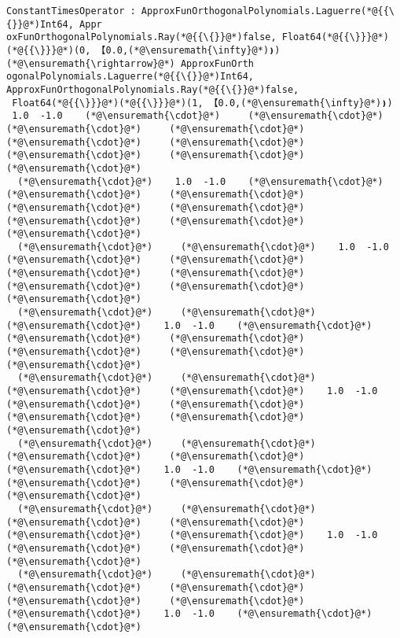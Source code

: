 \documentclass[12pt,a4paper]{article}
\begin{document}
\begin{lstlisting}
ConstantTimesOperator : ApproxFunOrthogonalPolynomials.Laguerre(*@{{\{}}@*)Int64, Appr
oxFunOrthogonalPolynomials.Ray(*@{{\{}}@*)false, Float64(*@{{\}}}@*)(*@{{\}}}@*)(0, 【0.0,(*@\ensuremath{\infty}@*)❫) (*@\ensuremath{\rightarrow}@*) ApproxFunOrth
ogonalPolynomials.Laguerre(*@{{\{}}@*)Int64, ApproxFunOrthogonalPolynomials.Ray(*@{{\{}}@*)false,
 Float64(*@{{\}}}@*)(*@{{\}}}@*)(1, 【0.0,(*@\ensuremath{\infty}@*)❫)
 1.0  -1.0    (*@\ensuremath{\cdot}@*)     (*@\ensuremath{\cdot}@*)     (*@\ensuremath{\cdot}@*)     (*@\ensuremath{\cdot}@*)     (*@\ensuremath{\cdot}@*)     (*@\ensuremath{\cdot}@*)     (*@\ensuremath{\cdot}@*)     (*@\ensuremath{\cdot}@*)   (*@\ensuremath{\cdot}@*)
  (*@\ensuremath{\cdot}@*)    1.0  -1.0    (*@\ensuremath{\cdot}@*)     (*@\ensuremath{\cdot}@*)     (*@\ensuremath{\cdot}@*)     (*@\ensuremath{\cdot}@*)     (*@\ensuremath{\cdot}@*)     (*@\ensuremath{\cdot}@*)     (*@\ensuremath{\cdot}@*)   (*@\ensuremath{\cdot}@*)
  (*@\ensuremath{\cdot}@*)     (*@\ensuremath{\cdot}@*)    1.0  -1.0    (*@\ensuremath{\cdot}@*)     (*@\ensuremath{\cdot}@*)     (*@\ensuremath{\cdot}@*)     (*@\ensuremath{\cdot}@*)     (*@\ensuremath{\cdot}@*)     (*@\ensuremath{\cdot}@*)   (*@\ensuremath{\cdot}@*)
  (*@\ensuremath{\cdot}@*)     (*@\ensuremath{\cdot}@*)     (*@\ensuremath{\cdot}@*)    1.0  -1.0    (*@\ensuremath{\cdot}@*)     (*@\ensuremath{\cdot}@*)     (*@\ensuremath{\cdot}@*)     (*@\ensuremath{\cdot}@*)     (*@\ensuremath{\cdot}@*)   (*@\ensuremath{\cdot}@*)
  (*@\ensuremath{\cdot}@*)     (*@\ensuremath{\cdot}@*)     (*@\ensuremath{\cdot}@*)     (*@\ensuremath{\cdot}@*)    1.0  -1.0    (*@\ensuremath{\cdot}@*)     (*@\ensuremath{\cdot}@*)     (*@\ensuremath{\cdot}@*)     (*@\ensuremath{\cdot}@*)   (*@\ensuremath{\cdot}@*)
  (*@\ensuremath{\cdot}@*)     (*@\ensuremath{\cdot}@*)     (*@\ensuremath{\cdot}@*)     (*@\ensuremath{\cdot}@*)     (*@\ensuremath{\cdot}@*)    1.0  -1.0    (*@\ensuremath{\cdot}@*)     (*@\ensuremath{\cdot}@*)     (*@\ensuremath{\cdot}@*)   (*@\ensuremath{\cdot}@*)
  (*@\ensuremath{\cdot}@*)     (*@\ensuremath{\cdot}@*)     (*@\ensuremath{\cdot}@*)     (*@\ensuremath{\cdot}@*)     (*@\ensuremath{\cdot}@*)     (*@\ensuremath{\cdot}@*)    1.0  -1.0    (*@\ensuremath{\cdot}@*)     (*@\ensuremath{\cdot}@*)   (*@\ensuremath{\cdot}@*)
  (*@\ensuremath{\cdot}@*)     (*@\ensuremath{\cdot}@*)     (*@\ensuremath{\cdot}@*)     (*@\ensuremath{\cdot}@*)     (*@\ensuremath{\cdot}@*)     (*@\ensuremath{\cdot}@*)     (*@\ensuremath{\cdot}@*)    1.0  -1.0    (*@\ensuremath{\cdot}@*)   (*@\ensuremath{\cdot}@*)

\end{lstlisting}
\end{document}
